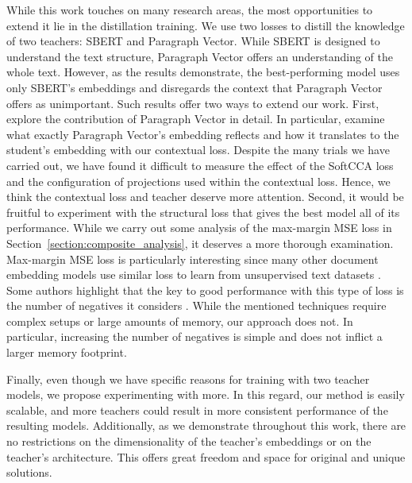 While this work touches on many research areas, the most opportunities to
extend it lie in the distillation training. We use two losses to distill the
knowledge of two teachers: SBERT and Paragraph Vector. While SBERT is designed
to understand the text structure, Paragraph Vector offers an understanding of
the whole text. However, as the results demonstrate, the best-performing model
uses only SBERT's embeddings and disregards the context that Paragraph Vector
offers as unimportant. Such results offer two ways to extend our work. First,
explore the contribution of Paragraph Vector in detail. In particular, examine
what exactly Paragraph Vector's embedding reflects and how it translates to the
student's embedding with our contextual loss. Despite the many trials we have
carried out, we have found it difficult to measure the effect of the SoftCCA
loss and the configuration of projections used within the contextual loss.
Hence, we think the contextual loss and teacher deserve more attention. Second,
it would be fruitful to experiment with the structural loss that gives the best
model all of its performance. While we carry out some analysis of the
max-margin MSE loss in Section~\ref{section:composite_analysis}, it deserves a
more thorough examination. Max-margin MSE loss is particularly interesting
since many other document embedding models use similar loss to learn from
unsupervised text datasets
\citep{cohan2020specter,ostendorff2022neighborhood,neelakantan2022text,izacard2021unsupervised}.
Some authors highlight that the key to good performance with this type of loss
is the number of negatives it considers
\citep{neelakantan2022text,izacard2021unsupervised}. While the mentioned
techniques require complex setups or large amounts of memory, our approach does
not. In particular, increasing the number of negatives is simple and does not
inflict a larger memory footprint.

Finally, even though we have specific reasons for training with two teacher
models, we propose experimenting with more. In this regard, our method is
easily scalable, and more teachers could result in more consistent performance
of the resulting models. Additionally, as we demonstrate throughout this work,
there are no restrictions on the dimensionality of the teacher's embeddings or
on the teacher's architecture. This offers great freedom and space for original
and unique solutions.
